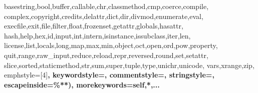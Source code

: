 {{	basestring,bool,buffer,callable,chr,classmethod,cmp,coerce,compile,%
	complex,copyright,credits,delattr,dict,dir,divmod,enumerate,eval,%
	execfile,exit,file,filter,float,frozenset,getattr,globals,hasattr,%
	hash,help,hex,id,input,int,intern,isinstance,issubclass,iter,len,%
	license,list,locals,long,map,max,min,object,oct,open,ord,pow,property,%
	quit,range,raw_input,reduce,reload,repr,reversed,round,set,setattr,%
	slice,sorted,staticmethod,str,sum,super,tuple,type,unichr,unicode,%
	vars,xrange,zip},
	emphstyle=[4]\color{purple}\bfseries,					  
%
%
  keywordstyle=\color{blue},          %
  commentstyle=\color{dkgreen},       %
  stringstyle=\color{mauve},         %
  escapeinside={\%*}{*)},            %
  morekeywords={self,*,...}               %
}
